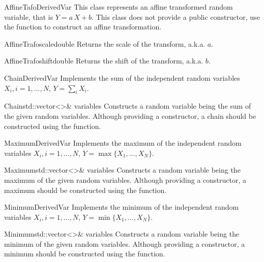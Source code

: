 \begin{defclassex}{AffineTafo}{DerivedVar}
This class represents an affine transformed random variable, that is $Y = a\,X+b$. This class does not provide a
public constructor, use the  function to construct an affine transformation.

\begin{defmeth}{AffineTrafo}{scale}{double}{}
 Returns the scale of the transform, a.k.a. $a$.
\end{defmeth}

\begin{defmeth}{AffineTrafo}{shift}{double}{}
 Returns the shift of the transform, a.k.a. $b$.
\end{defmeth}
\end{defclassex}

\begin{defclassex}{Chain}{DerivedVar}
Implements the sum of the independent random variables $X_i, i=1,\dots,N$, $Y = \sum_i X_i$.

\begin{classsyn}{Chain}{std::vector<>\& variables}
Constructs a random variable being the sum of the given random variables.
Although providing a constructor, a chain should be constructed using the
 function.
\end{classsyn}
\end{defclassex}

\begin{defclassex}{Maximum}{DerivedVar}
Implements the maximum of the independent random variables $X_i, i=1,\dots,N$, 
$Y = \max\{X_1,...,X_N\}$.

\begin{classsyn}{Maximum}{std::vector<>\& variables}
Constructs a random variable being the maximum of the given random variables.
Although providing a constructor, a maximum should be constructed using the
 function.
\end{classsyn}
\end{defclassex}

\begin{defclassex}{Minimum}{DerivedVar}
Implements the minimum of the independent random variables $X_i, i=1,\dots,N$, 
$Y = \min\{X_1,...,X_N\}$.

\begin{classsyn}{Minimum}{std::vector<>\& variables}
Constructs a random variable being the minimum of the given random variables.
Although providing a constructor, a minimum should be constructed using the 
 function.
\end{classsyn}
\end{defclassex}

